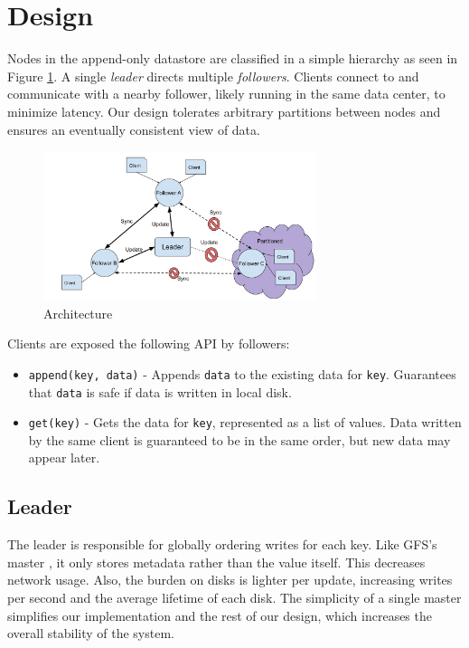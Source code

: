 \documentclass[11pt,english,twocolumn]{article}
\begin{document}
\section{Design}
Nodes in the append-only datastore are classified in a simple hierarchy as seen
in Figure \ref{Architecture}. A single \textit{leader} directs multiple
\textit{followers}. Clients connect to and communicate with a nearby follower,
likely running in the same data center, to minimize latency. Our design tolerates
arbitrary partitions between nodes and ensures an eventually consistent view of
data.
\begin{figure}[t]
\includegraphics[width=8cm]{figure/SystemStructure.pdf}
\caption{Architecture}
\label{Architecture}
\end{figure}
Clients are exposed the following API by followers:
\begin{itemize}
	\item \texttt{append(key, data)} - Appends \texttt{data} to the existing
		data for \texttt{key}. Guarantees that \texttt{data} is safe if data is written in local disk.
	\item \texttt{get(key)} - Gets the data for \texttt{key}, represented as a
		list of values. Data written by the same client is guaranteed to be in the same order, but new data may appear later.
\end{itemize}

\subsection{Leader}
The leader is responsible for globally ordering writes for each key. Like GFS's
master \cite{GFS}, it only stores metadata rather than the value itself.
This decreases network usage.  Also, the
burden on disks is lighter per update, increasing writes per second and the
average lifetime of each disk. The simplicity of a single master
simplifies our implementation and the rest of our design, which increases
the overall stability of the system. 
\end{document}
